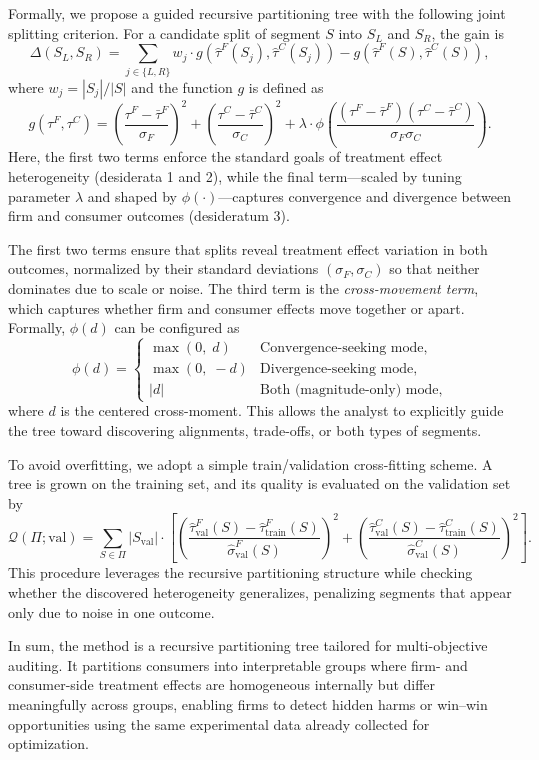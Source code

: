 \documentclass[11pt,letterpaper,english]{article}
\begin{document}
Formally, we propose a guided recursive partitioning tree with the following joint splitting criterion. For a candidate split of segment $S$ into $S_L$ and $S_R$, the gain is
\[
\Delta(S_L,S_R) = \sum_{j \in \{L,R\}} w_j \cdot g(\hat{\tau}^F(S_j), \hat{\tau}^C(S_j))
- g(\hat{\tau}^F(S), \hat{\tau}^C(S)),
\]
where $w_j = |S_j|/|S|$ and the function $g$ is defined as
\[
g(\tau^F,\tau^C) =
\left(\frac{\tau^F-\bar{\tau}^F}{\sigma_F}\right)^2 +
\left(\frac{\tau^C-\bar{\tau}^C}{\sigma_C}\right)^2
+ \lambda \cdot \phi\!\left(\frac{(\tau^F-\bar{\tau}^F)(\tau^C-\bar{\tau}^C)}{\sigma_F\sigma_C}\right).
\]
Here, the first two terms enforce the standard goals of treatment effect heterogeneity (desiderata 1 and 2), while the final term---scaled by tuning parameter $\lambda$ and shaped by $\phi(\cdot)$---captures convergence and divergence between firm and consumer outcomes (desideratum 3).

The first two terms ensure that splits reveal treatment effect variation in both outcomes, normalized by their standard deviations $(\sigma_F,\sigma_C)$ so that neither dominates due to scale or noise. The third term is the \emph{cross-movement term}, which captures whether firm and consumer effects move together or apart. Formally, $\phi(d)$ can be configured as
\[
\phi(d) =
\begin{cases}
\max(0, \; d) & \text{Convergence-seeking mode}, \\
\max(0, \; -d) & \text{Divergence-seeking mode}, \\
|d| & \text{Both (magnitude-only) mode},
\end{cases}
\]
where $d$ is the centered cross-moment. This allows the analyst to explicitly guide the tree toward discovering alignments, trade-offs, or both types of segments.

To avoid overfitting, we adopt a simple train/validation cross-fitting scheme. A tree is grown on the training set, and its quality is evaluated on the validation set by
\[
\mathcal{Q}(\Pi;\text{val}) = \sum_{S \in \Pi} |S_{\text{val}}| \cdot 
\left[ \left(\frac{\hat{\tau}^F_{\text{val}}(S)-\hat{\tau}^F_{\text{train}}(S)}{\hat{\sigma}^F_{\text{val}}(S)}\right)^2 +
       \left(\frac{\hat{\tau}^C_{\text{val}}(S)-\hat{\tau}^C_{\text{train}}(S)}{\hat{\sigma}^C_{\text{val}}(S)}\right)^2 \right].
\]
This procedure leverages the recursive partitioning structure while checking whether the discovered heterogeneity generalizes, penalizing segments that appear only due to noise in one outcome.

In sum, the method is a recursive partitioning tree tailored for multi-objective auditing. It partitions consumers into interpretable groups where firm- and consumer-side treatment effects are homogeneous internally but differ meaningfully across groups, enabling firms to detect hidden harms or win--win opportunities using the same experimental data already collected for optimization.
\end{document}
